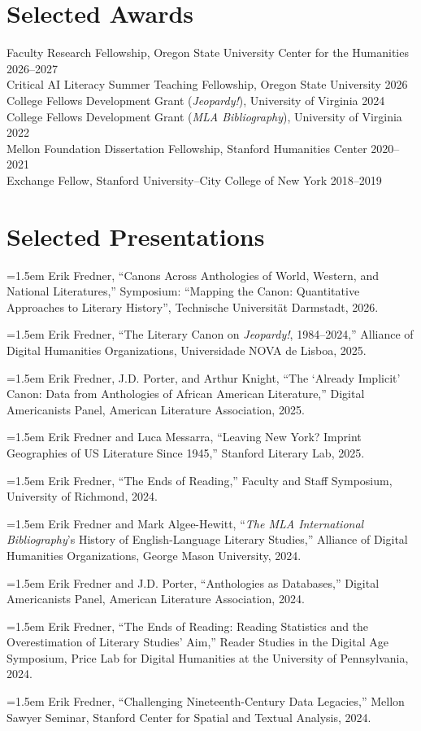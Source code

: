 \documentclass[12pt, letterpaper]{article}
\newcommand{\pubentry}[1]{\hangindent=1.5em\hangafter=1 #1\par}
\begin{document}
\section{Selected Awards}
Faculty Research Fellowship, Oregon State University Center for the Humanities \hfill 2026--2027 \\
Critical AI Literacy Summer Teaching Fellowship, Oregon State University \hfill 2026 \\
College Fellows Development Grant (\textit{Jeopardy!}), University of Virginia \hfill 2024 \\
College Fellows Development Grant (\textit{MLA Bibliography}), University of Virginia \hfill 2022 \\
Mellon Foundation Dissertation Fellowship, Stanford Humanities Center \hfill 2020--2021 \\
Exchange Fellow, Stanford University--City College of New York \hfill 2018--2019

\section{Selected Presentations}
\pubentry{Erik Fredner, ``Canons Across Anthologies of World, Western, and National Literatures,'' Symposium: ``Mapping the Canon: Quantitative Approaches to Literary History'', Technische Universität Darmstadt, 2026.}
\pubentry{Erik Fredner, ``The Literary Canon on \textit{Jeopardy!}, 1984--2024,'' Alliance of Digital Humanities Organizations, Universidade NOVA de Lisboa, 2025.}
\pubentry{Erik Fredner, J.D. Porter, and Arthur Knight, ``The `Already Implicit' Canon: Data from Anthologies of African American Literature,'' Digital Americanists Panel, American Literature Association, 2025.}
\pubentry{Erik Fredner and Luca Messarra, ``Leaving New York? Imprint Geographies of US Literature Since 1945,'' Stanford Literary Lab, 2025.}
\pubentry{Erik Fredner, ``The Ends of Reading,'' Faculty and Staff Symposium, University of Richmond, 2024.}
\pubentry{Erik Fredner and Mark Algee-Hewitt, ``\textit{The MLA International Bibliography}'s History of English-Language Literary Studies,'' Alliance of Digital Humanities Organizations, George Mason University, 2024.}
\pubentry{Erik Fredner and J.D. Porter, ``Anthologies as Databases,'' Digital Americanists Panel, American Literature Association, 2024.}
\pubentry{Erik Fredner, ``The Ends of Reading: Reading Statistics and the Overestimation of Literary Studies' Aim,'' Reader Studies in the Digital Age Symposium, Price Lab for Digital Humanities at the University of Pennsylvania, 2024.}
\pubentry{Erik Fredner, ``Challenging Nineteenth-Century Data Legacies,'' Mellon Sawyer Seminar, Stanford Center for Spatial and Textual Analysis, 2024.}
\end{document}

